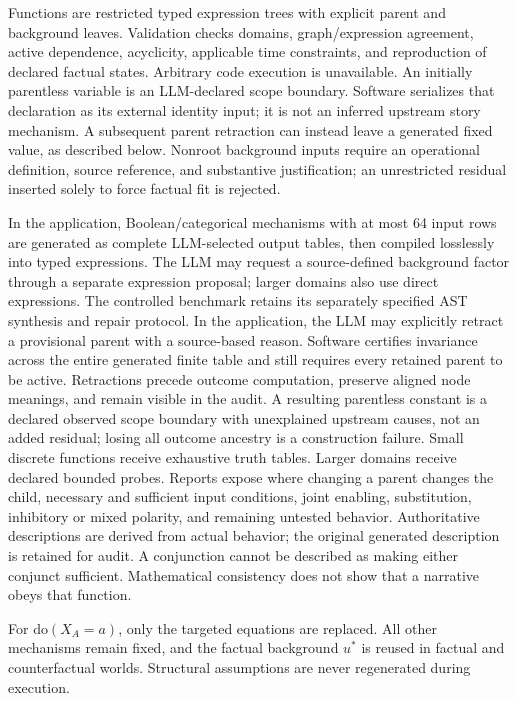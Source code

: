 \documentclass{svproc}
\begin{document}
Functions are restricted typed expression trees with explicit parent and background leaves. Validation checks domains, graph/expression agreement, active dependence, acyclicity, applicable time constraints, and reproduction of declared factual states. Arbitrary code execution is unavailable. An initially parentless variable is an LLM-declared scope boundary. Software serializes that declaration as its external identity input; it is not an inferred upstream story mechanism. A subsequent parent retraction can instead leave a generated fixed value, as described below. Nonroot background inputs require an operational definition, source reference, and substantive justification; an unrestricted residual inserted solely to force factual fit is rejected.

In the application, Boolean/categorical mechanisms with at most 64 input rows are generated as complete LLM-selected output tables, then compiled losslessly into typed expressions. The LLM may request a source-defined background factor through a separate expression proposal; larger domains also use direct expressions. The controlled benchmark retains its separately specified AST synthesis and repair protocol. In the application, the LLM may explicitly retract a provisional parent with a source-based reason. Software certifies invariance across the entire generated finite table and still requires every retained parent to be active. Retractions precede outcome computation, preserve aligned node meanings, and remain visible in the audit. A resulting parentless constant is a declared observed scope boundary with unexplained upstream causes, not an added residual; losing all outcome ancestry is a construction failure. Small discrete functions receive exhaustive truth tables. Larger domains receive declared bounded probes. Reports expose where changing a parent changes the child, necessary and sufficient input conditions, joint enabling, substitution, inhibitory or mixed polarity, and remaining untested behavior. Authoritative descriptions are derived from actual behavior; the original generated description is retained for audit. A conjunction cannot be described as making either conjunct sufficient. Mathematical consistency does not show that a narrative obeys that function.

For $\mathrm{do}(X_A=a)$, only the targeted equations are replaced. All other mechanisms remain fixed, and the factual background $u^*$ is reused in factual and counterfactual worlds. Structural assumptions are never regenerated during execution.
\end{document}
